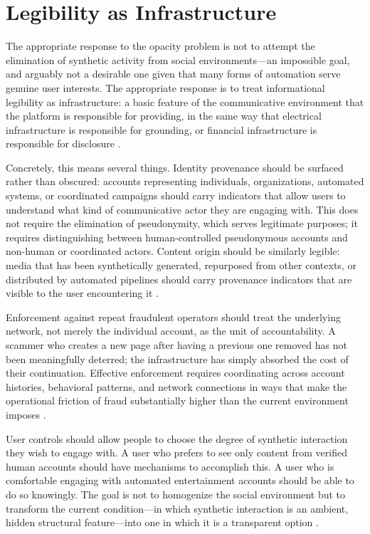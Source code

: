 \documentclass[12pt,a4paper]{article}
\begin{document}
\section{Legibility as Infrastructure}

The appropriate response to the opacity problem is not to attempt the elimination of synthetic
activity from social environments---an impossible goal, and arguably not a desirable one given
that many forms of automation serve genuine user interests. The appropriate response is to treat
informational legibility as infrastructure: a basic feature of the communicative environment
that the platform is responsible for providing, in the same way that electrical infrastructure
is responsible for grounding, or financial infrastructure is responsible for disclosure
\citep{gillespie2018,zuboff2019}.

Concretely, this means several things. Identity provenance should be surfaced rather than
obscured: accounts representing individuals, organizations, automated systems, or coordinated
campaigns should carry indicators that allow users to understand what kind of communicative
actor they are engaging with. This does not require the elimination of pseudonymity, which serves
legitimate purposes; it requires distinguishing between human-controlled pseudonymous accounts
and non-human or coordinated actors. Content origin should be similarly legible: media that has
been synthetically generated, repurposed from other contexts, or distributed by automated
pipelines should carry provenance indicators that are visible to the user encountering it
\citep{tufekci2015}.

Enforcement against repeat fraudulent operators should treat the underlying network, not merely
the individual account, as the unit of accountability. A scammer who creates a new page after
having a previous one removed has not been meaningfully deterred; the infrastructure has simply
absorbed the cost of their continuation. Effective enforcement requires coordinating across
account histories, behavioral patterns, and network connections in ways that make the operational
friction of fraud substantially higher than the current environment imposes \citep{gillespie2018}.

User controls should allow people to choose the degree of synthetic interaction they wish to
engage with. A user who prefers to see only content from verified human accounts should have
mechanisms to accomplish this. A user who is comfortable engaging with automated entertainment
accounts should be able to do so knowingly. The goal is not to homogenize the social environment
but to transform the current condition---in which synthetic interaction is an ambient, hidden
structural feature---into one in which it is a transparent option \citep{boyd2014}.
\end{document}
